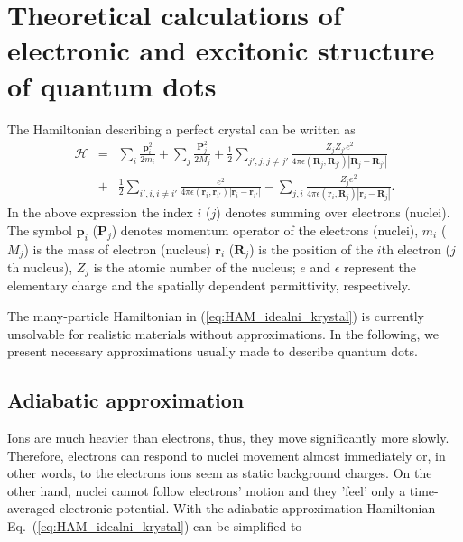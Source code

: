 
\chapter{Theoretical calculations of electronic and excitonic structure of quantum dots}\label{chap:theory}

The Hamiltonian describing a perfect crystal can be written as 
\begin{eqnarray}
\mathcal{H}& =& \sum_{i}\frac{\mathbf{p}_i ^2}{2m_i} + \sum_{j}\frac{\mathbf{P}_j^2}{2M_j}+ \frac{1}{2}\sum_{j', j, j\neq j'}   \frac{Z_j Z_{j'}e^2}{4\pi \epsilon(\mathbf{R}_j, \mathbf{R}_{j'}) |\mathbf{R}_j-\mathbf{R}_{j'}|}  \nonumber \\
&+&\frac{1}{2}\sum_{i', i, i\neq i'} \frac{e^2}{4\pi \epsilon(\mathbf{r}_i, \mathbf{r}_{i'}) |\mathbf{r}_i-\mathbf{r}_{i'}|} - \sum_{j, i} \frac{Z_j e^2}{4\pi \epsilon(\mathbf{r}_i, \mathbf{R}_{j}) |\mathbf{r}_i-\mathbf{R}_{j}|}. \label{eq:HAM_idealni_krystal}
\end{eqnarray}
In the above expression the index $i$ ($j$) denotes summing over electrons (nuclei). The symbol $\mathbf{p}_i$ ($\mathbf{P}_j$) denotes momentum operator of the electrons (nuclei), $m_i$ ($M_j$) is the mass of electron (nucleus) $\mathbf{r}_i$ ($\mathbf{R}_j$) is the position of the $i$th electron ($j$th nucleus), $Z_j$ is the atomic number of the nucleus; $e$ and $\epsilon$ represent the elementary charge and the spatially dependent permittivity, respectively.

The many-particle Hamiltonian in (\ref{eq:HAM_idealni_krystal}) is currently unsolvable for realistic materials without approximations. In the following, we present necessary approximations usually made to describe quantum dots.

\section{Adiabatic approximation}
Ions are much heavier than electrons, thus, they move significantly more slowly. %
Therefore, electrons can respond to nuclei movement almost immediately or, in other words, to the electrons ions seem as static background charges. On the other hand, nuclei cannot follow electrons' motion and they 'feel' only a time-averaged electronic potential. With the adiabatic approximation Hamiltonian Eq.~(\ref{eq:HAM_idealni_krystal}) can be simplified to


